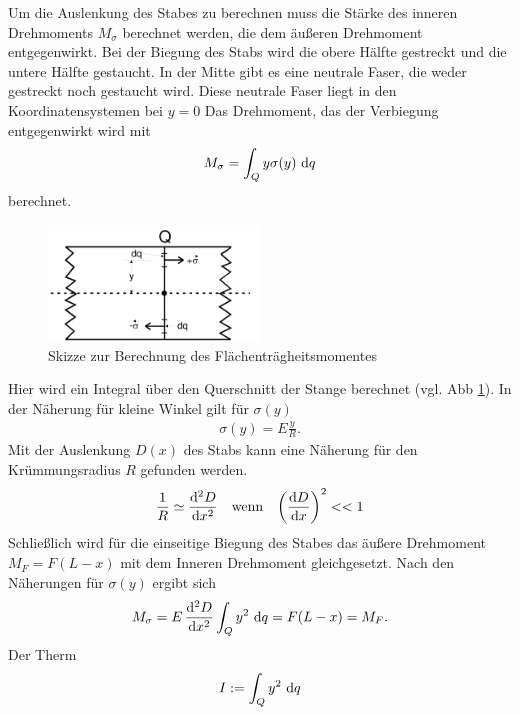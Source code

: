 Um die Auslenkung des Stabes zu berechnen muss die Stärke des inneren Drehmoments $M_\sigma$ berechnet werden, 
die dem äußeren Drehmoment entgegenwirkt.
Bei der Biegung des Stabs wird die obere Hälfte gestreckt und die untere Hälfte gestaucht.
In der Mitte gibt es eine neutrale Faser, die weder gestreckt noch gestaucht wird.
Diese neutrale Faser liegt in den Koordinatensystemen bei $y = 0$ 
Das Drehmoment, das der Verbiegung entgegenwirkt wird mit 
\begin{align}
    M_\sigma = \int_{Q}^{} y \sigma(y) \,\mathop{}\!\mathrm{d} q 
    \label{eq:inneres_Moment_int}
\end{align}
berechnet.
\begin{figure}
    \centering
    \includegraphics[width = 0.5\textwidth]{Abbildungen/Biegungsintegral.png}
    \caption{Skizze zur Berechnung des Flächenträgheitsmomentes \cite{man:v103}}
    \label{fig:Biegungsintegral}
\end{figure}
Hier wird ein Integral über den Querschnitt der Stange berechnet (vgl. Abb \ref{fig:Biegungsintegral}).
In der Näherung für kleine Winkel gilt für $\sigma(y)$
\begin{align*}
    \sigma(y) = E \frac{y}{R} .
\end{align*}
Mit der Auslenkung $D(x)$ des Stabs kann eine Näherung für den Krümmungsradius $R$ gefunden werden.
\begin{align*}
    \frac{1}{R} &\simeq  \frac{\mathop{}\!\mathrm{d}^2 D}{\mathop{}\!\mathrm{d} x^2} & &\text{wenn} & \left(\frac{\mathop{}\!\mathrm{d} D}{\mathop{}\!\mathrm{d} x}\right)^2 << 1 
\end{align*}
Schließlich wird für die einseitige Biegung des Stabes das äußere Drehmoment $M_F = F(L - x)$ mit dem Inneren Drehmoment gleichgesetzt.
Nach den Näherungen für $\sigma(y)$ ergibt sich
\begin{align}
    M_\sigma = E \, \frac{\diff^2 D}{\diff x^2} \int_{Q} y^2 \,\diff q = F (L - x) = M_F  . %
    \label{eq:Momentengleichung_einseitig}
\end{align}
Der Therm 
\begin{align}
    I := \int_{Q} y^2 \,\mathop{}\!\mathrm{d} q
\end{align} 
